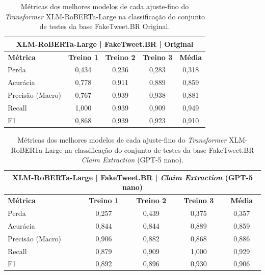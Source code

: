 \begin{table}[!htbp]
\centering
\begin{tabular}{l*4c}
\toprule
\multicolumn{5}{c}{\textbf{XLM-RoBERTa-Large | FakeTweet.BR | Original}} \\ 
\midrule
\textbf{Métrica} & \textbf{Treino 1} & \textbf{Treino 2} & \textbf{Treino 3} & \textbf{Média} \\ 
\midrule
Perda & 0,434 & 0,236 & 0,283 & 0,318 \\ 
Acurácia & 0,778 & 0,911 & 0,889 & 0,859 \\ 
Precisão (Macro) & 0,767 & 0,939 & 0,938 & 0,881 \\ 
Recall & 1,000 & 0,939 & 0,909 & 0,949 \\ 
F1 & 0,868 & 0,939 & 0,923 & 0,910 \\ 
\bottomrule
\end{tabular}
\caption{Métricas dos melhores modelos de cada ajuste-fino do \textit{Transformer} XLM-RoBERTa-Large na classificação do conjunto de testes da base FakeTweet.BR Original.}
\end{table}

\begin{table}[!htbp]
\centering
\begin{tabular}{l*4c}
\toprule
\multicolumn{5}{c}{\textbf{XLM-RoBERTa-Large | FakeTweet.BR | \textit{Claim Extraction} (GPT-5 nano)}} \\ 
\midrule
\textbf{Métrica} & \textbf{Treino 1} & \textbf{Treino 2} & \textbf{Treino 3} & \textbf{Média} \\ 
\midrule
Perda & 0,257 & 0,439 & 0,375 & 0,357 \\ 
Acurácia & 0,844 & 0,844 & 0,889 & 0,859 \\ 
Precisão (Macro) & 0,906 & 0,882 & 0,868 & 0,886 \\ 
Recall & 0,879 & 0,909 & 1,000 & 0,929 \\ 
F1 & 0,892 & 0,896 & 0,930 & 0,906 \\ 
\bottomrule
\end{tabular}
\caption{Métricas dos melhores modelos de cada ajuste-fino do \textit{Transformer} XLM-RoBERTa-Large na classificação do conjunto de testes da base FakeTweet.BR \textit{Claim Extraction} (GPT-5 nano).}
\end{table}

